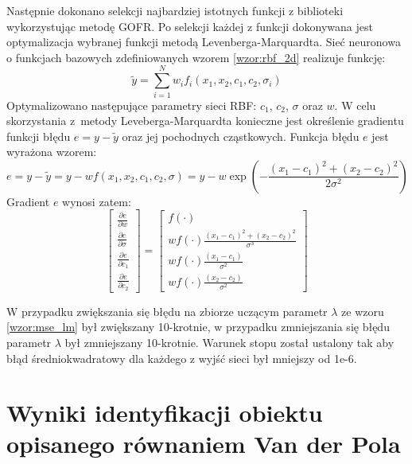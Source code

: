 Następnie dokonano selekcji najbardziej istotnych funkcji z biblioteki wykorzystując metodę GOFR. Po selekcji każdej z funkcji dokonywana jest optymalizacja wybranej funkcji metodą Levenberga-Marquardta. Sieć neuronowa o funkcjach bazowych zdefiniowanych wzorem \eqref{wzor:rbf_2d} realizuje funkcję:
\begin{equation}
	\tilde{y} = \sum_{i=1}^N w_i f_i(x_1,x_2,c_1,c_2,\sigma_i)
\end{equation}
Optymalizowano następujące parametry sieci RBF: $c_1$, $c_2$, $\sigma$ oraz $w$. W celu skorzystania z~metody Leveberga-Marquardta konieczne jest określenie gradientu funkcji błędu $e = y - \tilde{y}$ oraz jej pochodnych cząstkowych. Funkcja błędu $e$ jest wyrażona wzorem:
\begin{equation}
	e = y - \tilde{y} = y - w f(x_1,x_2,c_1,c_2,\sigma) = y - w \exp(-\frac{(x_1-c_1)^2 + (x_2-c_2)^2}{2 \sigma^2}) 
\end{equation}
Gradient $e$ wynosi zatem:
\begin{equation}
\begin{bmatrix}
	\frac{\partial e}{\partial w} \\
	\frac{\partial e}{\partial \sigma} \\
	\frac{\partial e}{\partial c_1} \\
	\frac{\partial e}{\partial c_2}
\end{bmatrix} = 
\begin{bmatrix}
	f(\cdot) \\
	w f(\cdot) \frac{(x_1 - c_1)^2 + (x_2 - c_2)^2}{\sigma^3}\\
	w f(\cdot) \frac{(x_1 - c_1)}{\sigma^2}\\
	w f(\cdot) \frac{(x_2 - c_2)}{\sigma^2}	
\end{bmatrix}
\end{equation}

W przypadku zwiększania się błędu na zbiorze uczącym parametr $\lambda$ ze wzoru \eqref{wzor:mse_lm} był zwiększany 10-krotnie, w przypadku zmniejszania się błędu parametr $\lambda$ był zmniejszany 10-krotnie. Warunek stopu został ustalony tak aby błąd średniokwadratowy dla każdego z wyjść sieci był mniejszy od 1e-6. 






\clearpage
\section{Wyniki identyfikacji obiektu opisanego równaniem Van der Pola}


